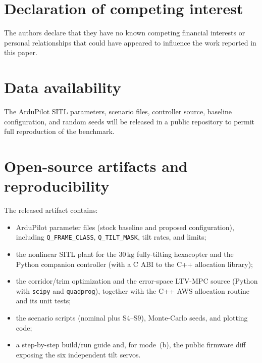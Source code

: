 \documentclass[preprint,3p,11pt]{elsarticle}
\newcommand{\SI}[2]{\ensuremath{#1\,#2}}
\newcommand{\kilogram}{\mathrm{kg}}
\begin{document}
\section*{Declaration of competing interest}
The authors declare that they have no known competing financial interests or
personal relationships that could have appeared to influence the work reported
in this paper.

\section*{Data availability}
The ArduPilot SITL parameters, scenario files, controller source, baseline
configuration, and random seeds will be released in a public repository to
permit full reproduction of the benchmark.

\appendix
\section{Open-source artifacts and reproducibility}\label{app:artifacts}
The released artifact contains:
\begin{itemize}[leftmargin=1.6em,itemsep=2pt]
  \item ArduPilot parameter files (stock baseline and proposed configuration),
  including \texttt{Q\_FRAME\_CLASS}, \texttt{Q\_TILT\_MASK}, tilt rates, and
  limits;
  \item the nonlinear SITL plant for the \SI{30}{\kilogram} fully-tilting
  hexacopter and the Python companion controller (with a C ABI to the C++
  allocation library);
  \item the corridor/trim optimization and the error-space LTV-MPC source
  (Python with \texttt{scipy} and \texttt{quadprog}), together with the C++
  AWS allocation routine and its unit tests;
  \item the scenario scripts (nominal plus S4--S9), Monte-Carlo seeds, and plotting code;
  \item a step-by-step build/run guide and, for mode~(b), the public firmware
  diff exposing the six independent tilt servos.
\end{itemize}



\end{document}
